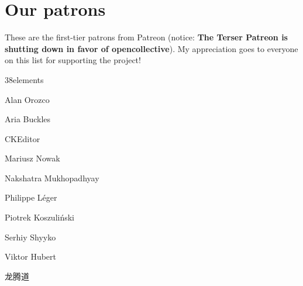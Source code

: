 \chapter{Our patrons }
\hypertarget{md_frontend_2node__modules_2terser_2_p_a_t_r_o_n_s}{}\label{md_frontend_2node__modules_2terser_2_p_a_t_r_o_n_s}
\label{md_frontend_2node__modules_2terser_2_p_a_t_r_o_n_s_autotoc_md9122}%
%


These are the first-\/tier patrons from Patreon (notice:\+ {\bfseries{The Terser Patreon is shutting down in favor of opencollective}}). My appreciation goes to everyone on this list for supporting the project!


\begin{DoxyItemize}
\item 38elements
\item Alan Orozco
\item Aria Buckles
\item CKEditor
\item Mariusz Nowak
\item Nakshatra Mukhopadhyay
\item Philippe Léger
\item Piotrek Koszuliński
\item Serhiy Shyyko
\item Viktor Hubert
\item 龙腾道 
\end{DoxyItemize}